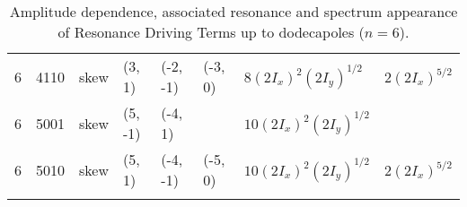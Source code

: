 {\begin{longtable}{llllllll}
6 & 4110 &   skew &    (3, 1) & (-2, -1) &  (-3, 0) &   \colorbox{blue!10}{$8 (2I_x)^ {2} (2I_y)^ {1/2}$} &           \colorbox{orange!10}{$2 (2I_x)^ {5/2} $} \\
6 & 5001 &   skew &   (5, -1) &  (-4, 1) &          &  \colorbox{blue!10}{$10 (2I_x)^ {2} (2I_y)^ {1/2}$} &                                                   \\
6 & 5010 &   skew &    (5, 1) & (-4, -1) &  (-5, 0) &  \colorbox{blue!10}{$10 (2I_x)^ {2} (2I_y)^ {1/2}$} &           \colorbox{orange!10}{$2 (2I_x)^ {5/2} $} \\
\bottomrule
\caption{Amplitude dependence, associated resonance and spectrum appearance of Resonance Driving
Terms up to dodecapoles ($n=6$).}
\end{longtable}
}